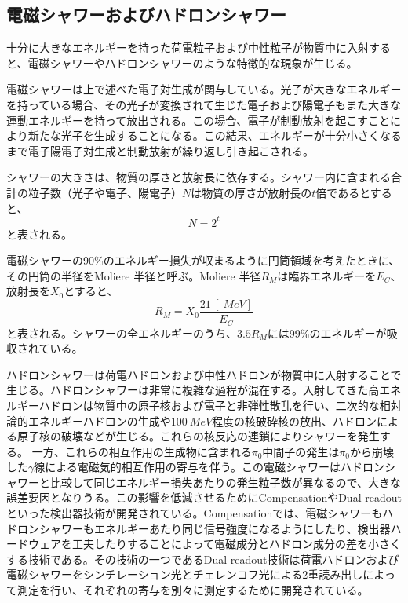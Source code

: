 \subsection{電磁シャワーおよびハドロンシャワー}
十分に大きなエネルギーを持った荷電粒子および中性粒子が物質中に入射すると、電磁シャワーやハドロンシャワーのような特徴的な現象が生じる。

電磁シャワーは上で述べた電子対生成が関与している。光子が大きなエネルギーを持っている場合、その光子が変換されて生じた電子および陽電子もまた大きな運動エネルギーを持って放出される。この場合、電子が制動放射を起こすことにより新たな光子を生成することになる。この結果、エネルギーが十分小さくなるまで電子陽電子対生成と制動放射が繰り返し引き起こされる。

シャワーの大きさは、物質の厚さと放射長に依存する。シャワー内に含まれる合計の粒子数（光子や電子、陽電子）$N$は物質の厚さが放射長の$t$倍であるとすると、
\[
N = 2^t
\]
と表される。

電磁シャワーの90\%のエネルギー損失が収まるように円筒領域を考えたときに、その円筒の半径をMoliere 半径と呼ぶ。Moliere 半径$R_M$は臨界エネルギーを$E_C$、放射長を$X_0$とすると、
\begin{equation}
R_M = X_0 \frac{21\ [\SI{}{MeV}]}{E_C}
\end{equation}
と表される。シャワーの全エネルギーのうち、$3.5R_M$には99\%のエネルギーが吸収されている。

ハドロンシャワーは荷電ハドロンおよび中性ハドロンが物質中に入射することで生じる。ハドロンシャワーは非常に複雑な過程が混在する。入射してきた高エネルギーハドロンは物質中の原子核および電子と非弾性散乱を行い、二次的な相対論的エネルギーハドロンの生成や$\SI{100}{MeV}$程度の核破砕核の放出、ハドロンによる原子核の破壊などが生じる。これらの核反応の連鎖によりシャワーを発生する。
一方、これらの相互作用の生成物に含まれる$\pi_0$中間子の発生は$\pi_0$から崩壊した$\gamma$線による電磁気的相互作用の寄与を伴う。この電磁シャワーはハドロンシャワーと比較して同じエネルギー損失あたりの発生粒子数が異なるので、大きな誤差要因となりうる。この影響を低減させるためにCompensationやDual-readoutといった検出器技術が開発されている。Compensationでは、電磁シャワーもハドロンシャワーもエネルギーあたり同じ信号強度になるようにしたり、検出器ハードウェアを工夫したりすることによって電磁成分とハドロン成分の差を小さくする技術である。その技術の一つであるDual-readout技術は荷電ハドロンおよび電磁シャワーをシンチレーション光とチェレンコフ光による2重読み出しによって測定を行い、それぞれの寄与を別々に測定するために開発されている。



